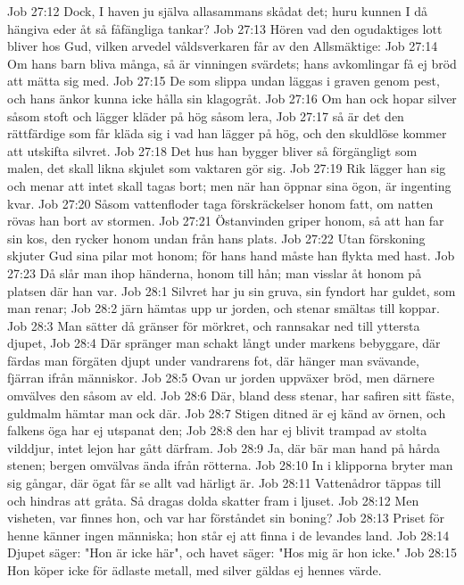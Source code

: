 Job 27:12  Dock, I haven ju själva allasammans skådat det; huru kunnen I då hängiva eder åt så fåfängliga tankar?
Job 27:13  Hören vad den ogudaktiges lott bliver hos Gud, vilken arvedel våldsverkaren får av den Allsmäktige:
Job 27:14  Om hans barn bliva många, så är vinningen svärdets; hans avkomlingar få ej bröd att mätta sig med.
Job 27:15  De som slippa undan läggas i graven genom pest, och hans änkor kunna icke hålla sin klagogråt.
Job 27:16  Om han ock hopar silver såsom stoft och lägger kläder på hög såsom lera,
Job 27:17  så är det den rättfärdige som får kläda sig i vad han lägger på hög, och den skuldlöse kommer att utskifta silvret.
Job 27:18  Det hus han bygger bliver så förgängligt som malen, det skall likna skjulet som vaktaren gör sig.
Job 27:19  Rik lägger han sig och menar att intet skall tagas bort; men när han öppnar sina ögon, är ingenting kvar.
Job 27:20  Såsom vattenfloder taga förskräckelser honom fatt, om natten rövas han bort av stormen.
Job 27:21  Östanvinden griper honom, så att han far sin kos, den rycker honom undan från hans plats.
Job 27:22  Utan förskoning skjuter Gud sina pilar mot honom; för hans hand måste han flykta med hast.
Job 27:23  Då slår man ihop händerna, honom till hån; man visslar åt honom på platsen där han var.
Job 28:1  Silvret har ju sin gruva, sin fyndort har guldet, som man renar;
Job 28:2  järn hämtas upp ur jorden, och stenar smältas till koppar.
Job 28:3  Man sätter då gränser för mörkret, och rannsakar ned till yttersta djupet,
Job 28:4  Där spränger man schakt långt under markens bebyggare, där färdas man förgäten djupt under vandrarens fot, där hänger man svävande, fjärran ifrån människor.
Job 28:5  Ovan ur jorden uppväxer bröd, men därnere omvälves den såsom av eld.
Job 28:6  Där, bland dess stenar, har safiren sitt fäste, guldmalm hämtar man ock där.
Job 28:7  Stigen ditned är ej känd av örnen, och falkens öga har ej utspanat den;
Job 28:8  den har ej blivit trampad av stolta vilddjur, intet lejon har gått därfram.
Job 28:9  Ja, där bär man hand på hårda stenen; bergen omvälvas ända ifrån rötterna.
Job 28:10  In i klipporna bryter man sig gångar, där ögat får se allt vad härligt är.
Job 28:11  Vattenådror täppas till och hindras att gråta. Så dragas dolda skatter fram i ljuset.
Job 28:12  Men visheten, var finnes hon, och var har förståndet sin boning?
Job 28:13  Priset för henne känner ingen människa; hon står ej att finna i de levandes land.
Job 28:14  Djupet säger: "Hon är icke här", och havet säger: "Hos mig är hon icke."
Job 28:15  Hon köper icke för ädlaste metall, med silver gäldas ej hennes värde.

